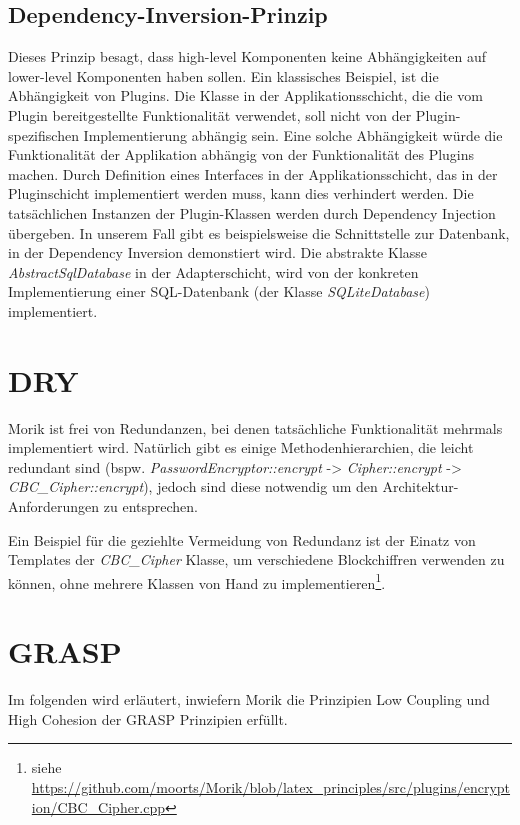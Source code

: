 \subsection{Dependency-Inversion-Prinzip}

Dieses Prinzip besagt, dass high-level Komponenten keine Abhängigkeiten auf lower-level Komponenten haben sollen. Ein klassisches Beispiel, ist die Abhängigkeit von Plugins. Die Klasse in der Applikationsschicht, die die vom Plugin bereitgestellte Funktionalität verwendet, soll nicht von der Plugin-spezifischen Implementierung abhängig sein. Eine solche Abhängigkeit würde die Funktionalität der Applikation abhängig von der Funktionalität des Plugins machen. Durch Definition eines Interfaces in der Applikationsschicht, das in der Pluginschicht implementiert werden muss, kann dies verhindert werden. Die tatsächlichen Instanzen der Plugin-Klassen werden durch Dependency Injection übergeben. In unserem Fall gibt es beispielsweise die Schnittstelle zur Datenbank, in der Dependency Inversion demonstiert wird. Die abstrakte Klasse \textit{AbstractSqlDatabase} in der Adapterschicht, wird von der konkreten Implementierung einer SQL-Datenbank (der Klasse \textit{SQLiteDatabase}) implementiert.

\section{DRY}

Morik ist frei von Redundanzen, bei denen tatsächliche Funktionalität mehrmals implementiert wird. Natürlich gibt es einige Methodenhierarchien, die leicht redundant sind (bspw. \textit{PasswordEncryptor::encrypt} -> \textit{Cipher::encrypt} -> \textit{CBC\_Cipher::encrypt}), jedoch sind diese notwendig um den Architektur-Anforderungen zu entsprechen.

Ein Beispiel für die geziehlte Vermeidung von Redundanz ist der Einatz von Templates der \textit{CBC\_Cipher} Klasse, um verschiedene Blockchiffren verwenden zu können, ohne mehrere Klassen von Hand zu implementieren\footnote{siehe \url{https://github.com/moorts/Morik/blob/latex\_principles/src/plugins/encryption/CBC\_Cipher.cpp}}.

\section{GRASP}

Im folgenden wird erläutert, inwiefern Morik die Prinzipien Low Coupling und High Cohesion der GRASP Prinzipien erfüllt.


